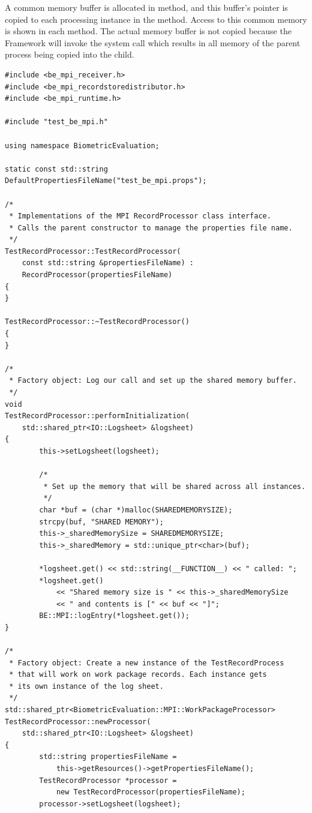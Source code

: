 A common memory buffer is allocated in  method,
and this buffer's pointer is copied to each processing instance in the
 method. Access to this common memory is shown in each
 method. The actual memory buffer is not copied because
the Framework will invoke the system call  which results in all
memory of the parent process being copied into the child. 

\begin{lstlisting}[caption={MPI Framework Application Implementation}, label=lst:mpiappimpl]
#include <be_mpi_receiver.h>
#include <be_mpi_recordstoredistributor.h>
#include <be_mpi_runtime.h>

#include "test_be_mpi.h"

using namespace BiometricEvaluation;

static const std::string DefaultPropertiesFileName("test_be_mpi.props");

/*
 * Implementations of the MPI RecordProcessor class interface.
 * Calls the parent constructor to manage the properties file name.
 */
TestRecordProcessor::TestRecordProcessor(
    const std::string &propertiesFileName) :
    RecordProcessor(propertiesFileName)
{
}

TestRecordProcessor::~TestRecordProcessor()
{
}

/*
 * Factory object: Log our call and set up the shared memory buffer.
 */
void
TestRecordProcessor::performInitialization(
    std::shared_ptr<IO::Logsheet> &logsheet)
{
        this->setLogsheet(logsheet);

        /*
         * Set up the memory that will be shared across all instances.
         */
        char *buf = (char *)malloc(SHAREDMEMORYSIZE);
        strcpy(buf, "SHARED MEMORY");
        this->_sharedMemorySize = SHAREDMEMORYSIZE;
        this->_sharedMemory = std::unique_ptr<char>(buf);

        *logsheet.get() << std::string(__FUNCTION__) << " called: ";
        *logsheet.get()
            << "Shared memory size is " << this->_sharedMemorySize
            << " and contents is [" << buf << "]";
        BE::MPI::logEntry(*logsheet.get());
}

/*
 * Factory object: Create a new instance of the TestRecordProcess
 * that will work on work package records. Each instance gets
 * its own instance of the log sheet.
 */
std::shared_ptr<BiometricEvaluation::MPI::WorkPackageProcessor>
TestRecordProcessor::newProcessor(
    std::shared_ptr<IO::Logsheet> &logsheet)
{
        std::string propertiesFileName =
            this->getResources()->getPropertiesFileName();
        TestRecordProcessor *processor =
            new TestRecordProcessor(propertiesFileName);
        processor->setLogsheet(logsheet);


\end{lstlisting}
